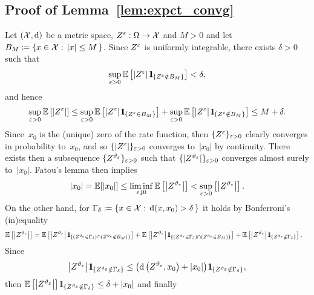 \subsection{Proof of Lemma~\ref{lem:expct_convg}}\label{sec:lem:expct_convg_Proof}
Let $(\mathcal{X}, \mathrm{d})$ be a metric space, $Z^\varepsilon:\Omega\rightarrow \mathcal{X}$ and $M>0$ and let $B_M \coloneqq \left \{ x\in\mathcal{X}: \, |x| \leq M \, \right \}$. 
Since $Z^\varepsilon$ is uniformly integrable, there exists $\delta>0$ such that
\[
\sup_{\eps>0}\EE\left[ \left\vert Z^\eps \right\vert \ind_{\left\{ Z^\eps \notin B_M \right\}} \right] < \delta,
\]
and hence 
$$
\sup_{\eps>0}\EE\left[ \left\vert Z^\eps \right\vert \right] \leq \sup_{\eps>0}\EE\left[ \left\vert Z^\eps \right\vert \ind_{\left\{ Z^\eps \in B_M \right\}} \right] + \sup_{\eps>0}\EE\left[ \left\vert Z^\eps \right\vert \ind_{\left\{ Z^\eps \notin B_M \right\}} \right]
\leq M + \delta.
$$
Since~$x_0$ is the (unique) zero of the rate function, then $\{Z^{\varepsilon}\}_{\varepsilon>0}$ clearly converges in probability to~$x_0$,
and so $\{|Z^{\varepsilon}|\}_{\varepsilon>0}$ converges to~$|x_0|$ by continuity. There exists then a subsequence $\{Z^{\vartheta_{\varepsilon}}\}_{\varepsilon>0}$ such that $\{|Z^{\vartheta_{\varepsilon}}|\}_{\varepsilon>0}$
converges almost surely to~$|x_0|$.
Fatou's lemma then implies
$$
|x_0| = \mathbb{E}[|x_0|] \leq \liminf_{\varepsilon\downarrow 0} \mathbb{E}\left[ \left\vert Z^{\vartheta_{\varepsilon}} \right\vert \right] < \sup_{\varepsilon>0} \left[ \left\vert Z^{\vartheta_{\varepsilon}} \right\vert \right].
$$
On the other hand, for ${\Gamma_{\delta} \coloneqq \{x \in \mathcal{X}: \, \mathrm{d}(x,x_0)>\delta \, \}}$ it holds by Bonferroni's (in)equality
\begin{align*}
\EE\left[ \left\vert Z^{\vartheta_{\eps}} \right\vert \right] &= \EE\left[ \left\vert Z^{\vartheta_{\eps}} \right\vert \ind_{\left \{ (Z^{\vartheta_{\eps}} \in \Gamma_\delta) \cap (Z^{\vartheta_{\eps}} \notin B_M) \right \}} \right] + \EE\left[ \left\vert Z^{\vartheta_{\eps}} \right\vert \ind_{\left \{ (Z^{\vartheta_{\eps}} \in \Gamma_\delta) \cap (Z^{\vartheta_{\eps}} \in B_M) \right \}} \right] + \EE\left[ \left\vert Z^{\vartheta_{\eps}} \right\vert \ind_{\left \{ Z^{\vartheta_{\eps}} \notin \Gamma_\delta \right \}} \right].
\end{align*}
Since 
\[\left\vert Z^{\vartheta_{\eps}} \right\vert \ind_{\left \{ Z^{\vartheta_{\eps}} \notin \Gamma_\delta \right \}}\leq \left ( \D\left(Z^{\vartheta_{\eps}}, x_0\right) + |x_0| \right ) \ind_{\left \{ Z^{\vartheta_{\eps}} \notin \Gamma_\delta \right \}},
\]
then $\EE\left[ \left\vert Z^{\vartheta_{\eps}} \right\vert \right]\ind_{\left \{ Z^{\vartheta_{\eps}} \notin \Gamma_\delta \right \}} \leq \delta + |x_0|$ and finally
